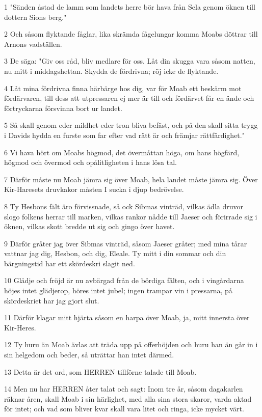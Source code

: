 \par 1 "Sänden åstad de lamm som landets herre bör hava från Sela genom öknen till dottern Sions berg."
\par 2 Och såsom flyktande fåglar, lika skrämda fågelungar komma Moabs döttrar till Arnons vadställen.
\par 3 De säga: "Giv oss råd, bliv medlare för oss. Låt din skugga vara såsom natten, nu mitt i middagshettan. Skydda de fördrivna; röj icke de flyktande.
\par 4 Låt mina fördrivna finna härbärge hos dig, var för Moab ett beskärm mot fördärvaren, till dess att utpressaren ej mer är till och fördärvet får en ände och förtryckarna försvinna bort ur landet.
\par 5 Så skall genom eder mildhet eder tron bliva befäst, och på den skall sitta trygg i Davids hydda en furste som far efter vad rätt är och främjar rättfärdighet."
\par 6 Vi hava hört om Moabs högmod, det övermåttan höga, om hans högfärd, högmod och övermod och opålitligheten i hans lösa tal.
\par 7 Därför måste nu Moab jämra sig över Moab, hela landet måste jämra sig. Över Kir-Haresets druvkakor måsten I sucka i djup bedrövelse.
\par 8 Ty Hesbons fält äro förvissnade, så ock Sibmas vinträd, vilkas ädla druvor slogo folkens herrar till marken, vilkas rankor nådde till Jaeser och förirrade sig i öknen, vilkas skott bredde ut sig och gingo över havet.
\par 9 Därför gråter jag över Sibmas vinträd, såsom Jaeser gråter; med mina tårar vattnar jag dig, Hesbon, och dig, Eleale. Ty mitt i din sommar och din bärgningstid har ett skördeskri slagit ned.
\par 10 Glädje och fröjd är nu avbärgad från de bördiga fälten, och i vingårdarna höjes intet glädjerop, höres intet jubel; ingen trampar vin i pressarna, på skördeskriet har jag gjort slut.
\par 11 Därför klagar mitt hjärta såsom en harpa över Moab, ja, mitt innersta över Kir-Heres.
\par 12 Ty huru än Moab ävlas att träda upp på offerhöjden och huru han än går in i sin helgedom och beder, så uträttar han intet därmed.
\par 13 Detta är det ord, som HERREN tillförne talade till Moab.
\par 14 Men nu har HERREN åter talat och sagt: Inom tre år, såsom dagakarlen räknar åren, skall Moab i sin härlighet, med alla sina stora skaror, varda aktad för intet; och vad som bliver kvar skall vara litet och ringa, icke mycket värt.

